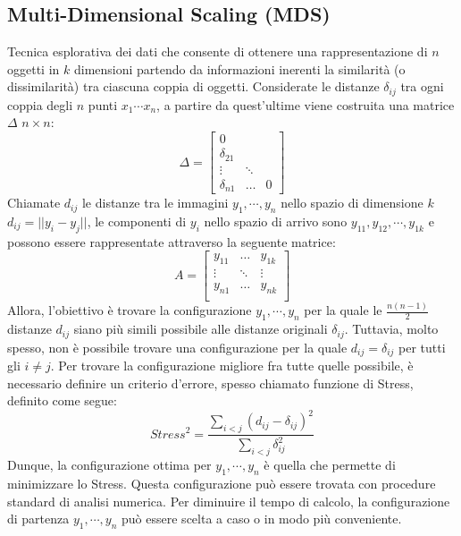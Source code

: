 \documentclass[11pt,a4paper,twocolumn]{article}
\begin{document}
\subsection{Multi-Dimensional Scaling (MDS)}
Tecnica esplorativa dei dati che consente di ottenere una rappresentazione di $n$ oggetti in $k$ dimensioni partendo da informazioni inerenti la similarità (o dissimilarità) tra  ciascuna coppia di oggetti. Considerate le distanze $ \delta_{ij} $ tra ogni coppia degli $n$ punti $x_1 \cdots x_n$, a partire da quest'ultime viene costruita una matrice $\Delta$ $n \times n$:
\begin{equation}
\nonumber
\Delta=\begin{bmatrix}
0 \\
\delta_{21} &&\\
\vdots & \ddots\\
\delta_{n1} &   \dots     & 0
\end{bmatrix}
\end{equation}
Chiamate $d_{ij}$ le distanze tra le immagini $ y_{1},\cdots,y_{n}$ nello spazio di dimensione $k$ $d_{ij}=\lvert\lvert{y_i-y_j}\lvert\lvert$, le componenti di $y_i$ nello spazio di arrivo sono $y_{11},y_{12},\cdots,y_{1k}$ e possono essere rappresentate attraverso la seguente matrice:
\begin{equation}
\nonumber
A = \begin{bmatrix}
y_{11}           & \dots         & y_{1k}         \\
\vdots   &  \ddots    & \vdots \\
y_{n1}          & \dots         & y_{nk}         \\
\end{bmatrix}
\end{equation}
Allora, l'obiettivo è trovare la configurazione $y_{1},\cdots,y_{n}$ per la quale le $\frac{n(n-1)}{2}$ distanze $d_{ij}$ siano più simili possibile alle distanze originali $\delta_{ij}$. Tuttavia, molto spesso, non è possibile trovare una configurazione per la quale $d_{ij} = \delta_{ij}$ per tutti gli $i \neq j$. Per trovare la configurazione migliore fra tutte quelle possibile, è necessario definire un criterio d'errore, spesso chiamato funzione di Stress, definito come segue:
\begin{equation}
\nonumber
Stress^2=\frac{\sum_{i<j}{(d_{ij}-\delta_{ij})^2}}{\sum_{i<j}{\delta_{ij}^2}}
\end{equation}
Dunque, la configurazione ottima per $y_1,\cdots,y_n$ è quella che permette di minimizzare lo Stress. Questa configurazione può essere trovata con  procedure standard di analisi numerica. Per diminuire il tempo di calcolo, la configurazione di partenza $y_1,\cdots,y_n$ può essere scelta a caso o in  modo più conveniente.
\end{document}

